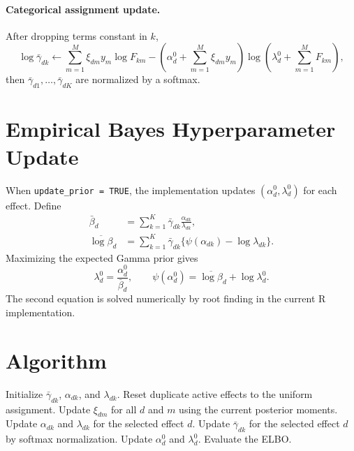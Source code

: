 \documentclass[11pt]{article}
\newcommand{\gb}{\bar{\gamma}}
\begin{document}
\paragraph{Categorical assignment update.}
After dropping terms constant in $k$,
\[
  \log \gb_{dk}
  \leftarrow
  \sum_{m=1}^M \xi_{dm}y_m \log F_{km}
  - \left(\alpha_d^0 + \sum_{m=1}^M \xi_{dm}y_m\right)
    \log\left(\lambda_d^0+\sum_{m=1}^M F_{km}\right),
\]
then $\gb_{d1},\ldots,\gb_{dK}$ are normalized by a softmax.

\section{Empirical Bayes Hyperparameter Update}

When \texttt{update\_prior = TRUE}, the implementation updates
$(\alpha_d^0,\lambda_d^0)$ for each effect. Define
\begin{align}
  \bar{\beta}_d
  &= \sum_{k=1}^K \gb_{dk}\frac{\alpha_{dk}}{\lambda_{dk}}, \\
  \overline{\log \beta}_d
  &= \sum_{k=1}^K \gb_{dk}
     \{\psi(\alpha_{dk})-\log \lambda_{dk}\}.
\end{align}
Maximizing the expected Gamma prior gives
\[
  \lambda_d^0 = \frac{\alpha_d^0}{\bar{\beta}_d},
  \qquad
  \psi(\alpha_d^0) = \overline{\log \beta}_d + \log \lambda_d^0.
\]
The second equation is solved numerically by root finding in the current R
implementation.

\section{Algorithm}

\begin{algorithm}[H]
\caption{Poisson SuSiE}
\begin{algorithmic}[1]
\State Initialize $\gb_{dk}$, $\alpha_{dk}$, and $\lambda_{dk}$.
    \State Reset duplicate active effects to the uniform assignment.
  \EndIf
    \State Update $\xi_{dm}$ for all $d$ and $m$ using the current posterior moments.
    \State Update $\alpha_{dk}$ and $\lambda_{dk}$ for the selected effect $d$.
    \State Update $\gb_{dk}$ for the selected effect $d$ by softmax normalization.
      \State Update $\alpha_d^0$ and $\lambda_d^0$.
    \EndIf
  \EndFor
  \State Evaluate the ELBO.
\EndFor
\end{algorithmic}
\end{algorithm}
\end{document}
